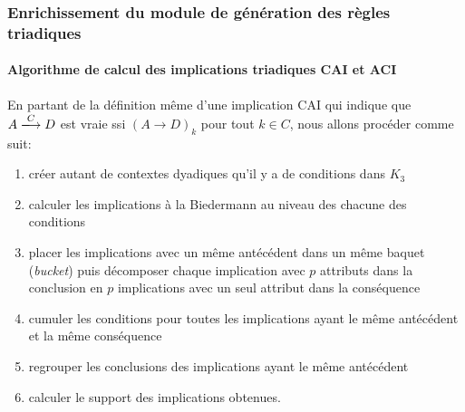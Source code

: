 \documentclass[french]{beamer}
\begin{document}
\begin{frame}
\frametitle{Enrichissement du module de génération des règles triadiques}
\framesubtitle{Algorithme de calcul des implications triadiques CAI et ACI}
En partant de la définition même d'une implication CAI qui indique que $A \xlongrightarrow{C} D$ est vraie ssi $(A \rightarrow D)_k$ pour tout $k \in C$, nous allons procéder comme suit:
\begin{enumerate}
	\item créer autant de contextes dyadiques qu'il y a de conditions dans $K_3$
	\item calculer les implications à la Biedermann au niveau des chacune des conditions
	\item placer les implications avec un même antécédent dans un même baquet (\emph{bucket}) puis décomposer chaque implication avec $p$ attributs dans la conclusion en $p$ implications avec un seul attribut dans la conséquence 
	\item cumuler les conditions pour toutes les implications ayant le même antécédent et la même conséquence
	\item regrouper les conclusions des implications ayant le même antécédent
	\item calculer le support des implications obtenues.		
\end{enumerate}
\end{frame}



\end{document}
